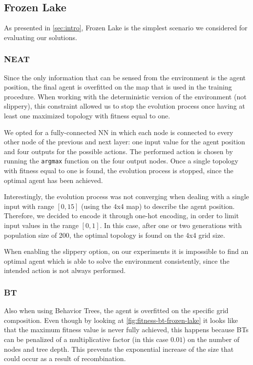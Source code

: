 \subsection{Frozen Lake}
As presented in \cref{sec:intro}, Frozen Lake is the simplest scenario we considered for evaluating our solutions.

\subsubsection{NEAT}
Since the only information that can be sensed from the environment is the agent position, the final agent is overfitted on the map that is used in the training procedure. When working with the deterministic version of the environment (not slippery), this constraint allowed us to stop the evolution process once having at least one maximized topology with fitness equal to one.

We opted for a fully-connected NN in which each node is connected to every other node of the previous and next layer: one input value for the agent position and four outputs for the possible actions. The performed action is chosen by running the \texttt{argmax} function on the four output nodes. Once a single topology with fitness equal to one is found, the evolution process is stopped, since the optimal agent has been achieved.

Interestingly, the evolution process was not converging when dealing with a single input with range \([0,15]\) (using the 4x4 map) to describe the agent position. Therefore, we decided to encode it through one-hot encoding, in order to limit input values in the range \([0,1]\). In this case, after one or two generations with population size of 200, the optimal topology is found on the 4x4 grid size.

When enabling the slippery option, on our experiments it is impossible to find an optimal agent which is able to solve the environment consistently, since the intended action is not always performed.

\subsubsection{BT}
Also when using Behavior Trees, the agent is overfitted on the specific grid composition. Even though by looking at \cref{fig:fitness-bt-frozen-lake} it looks like that the maximum fitness value is never fully achieved, this happens because BTs can be penalized of a multiplicative factor (in this case \(0.01\)) on the number of nodes and tree depth. This prevents the exponential increase of the size that could occur as a result of recombination.

